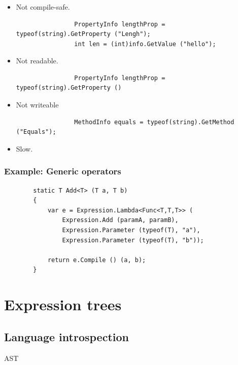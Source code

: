 \documentclass{beamer}
\begin{document}
	\begin{frame}[fragile]
		\frametitle{}
		\begin{itemize}
			\item Not compile-safe.
				\pause
				\begin{verbatim}
				PropertyInfo lengthProp = typeof(string).GetProperty ("Lengh");
				int len = (int)info.GetValue ("hello");
				\end{verbatim}
				\pause
			\item Not readable.
				\pause
				\begin{verbatim}
				PropertyInfo lengthProp = typeof(string).GetProperty ()
				\end{verbatim}
				\pause
			\item Not writeable
				\pause
				\begin{verbatim}
				MethodInfo equals = typeof(string).GetMethod ("Equals");
				\end{verbatim}
				\pause
			\item Slow. \pause
		\end{itemize}
	\end{frame}

	\begin{frame}
	\end{frame}

	\begin{frame}[fragile]
		\frametitle{Example: Generic operators}
		\begin{verbatim}
		static T Add<T> (T a, T b)
		{
	    	var e = Expression.Lambda<Func<T,T,T>> (
	        	Expression.Add (paramA, paramB),
	        	Expression.Parameter (typeof(T), "a"),
	        	Expression.Parameter (typeof(T), "b"));

	    	return e.Compile () (a, b);
		}
		\end{verbatim}
	\end{frame}

\section{Expression trees}
\subsection{Language introspection}
	\begin{frame}
		AST
	\end{frame}
	\begin{frame}
	\end{frame}
\end{document}
